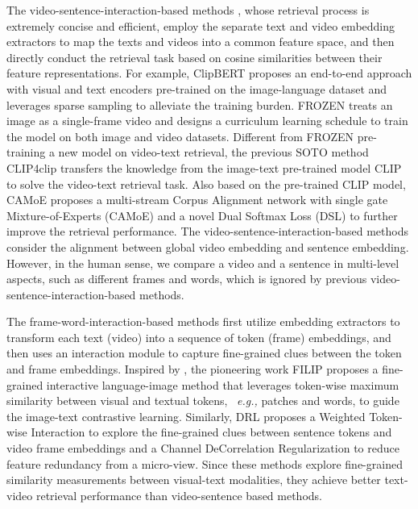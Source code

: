 \documentclass{article}
\begin{document}
The video-sentence-interaction-based methods \cite{luo2021clip4clip,liu2019use,portillo2021straightforward,bain2021frozen,croitoru2021teachtext,gabeur2020multi,liu2021hit,liu2019use,khattab2020colbert,kim2021vilt}, whose retrieval process is extremely concise and efficient, employ the separate text and video embedding extractors to map the texts and videos into a common feature space, and then directly conduct the retrieval task based on cosine similarities between their feature representations. For example, ClipBERT \cite{lei2021less} proposes an end-to-end approach with visual and text encoders pre-trained on the image-language dataset and leverages sparse sampling to alleviate the training burden.
FROZEN \cite{bain2021frozen} treats an image as a single-frame video and designs a curriculum learning schedule to train the model on both image and video datasets. Different from FROZEN pre-training a new model on video-text retrieval, the previous SOTO method CLIP4clip \cite{luo2021clip4clip} transfers the knowledge from the image-text pre-trained model CLIP \cite{radford2021learning} to solve the video-text retrieval task. Also based on the pre-trained CLIP model, CAMoE \cite{cheng2021improving} proposes a multi-stream Corpus Alignment network with single gate Mixture-of-Experts (CAMoE) and a novel Dual Softmax Loss (DSL) to further improve the retrieval performance.
The video-sentence-interaction-based methods consider the alignment between global video embedding and sentence embedding. 
However, in the human sense, we compare a video and a sentence in multi-level aspects, such as different frames and words, which is ignored by previous video-sentence-interaction-based methods.

The frame-word-interaction-based methods first utilize embedding extractors to transform each text (video) into a sequence of token (frame) embeddings, and then uses an interaction module to capture fine-grained clues between the token and frame embeddings.
Inspired by \cite{dzabraev2021mdmmt}, the pioneering work FILIP \cite{yao2021filip} proposes a fine-grained interactive language-image method that leverages token-wise maximum similarity between visual and textual tokens, ~\emph{e.g.,} patches and words, to guide the image-text contrastive learning. 
Similarly, DRL \cite{wang2022disentangled} proposes a Weighted Token-wise Interaction to explore the fine-grained clues between sentence tokens and video frame embeddings and a Channel DeCorrelation Regularization to reduce feature redundancy from a micro-view.
Since these methods explore fine-grained similarity measurements between visual-text modalities, they achieve better text-video retrieval performance than video-sentence based methods.
\end{document}

